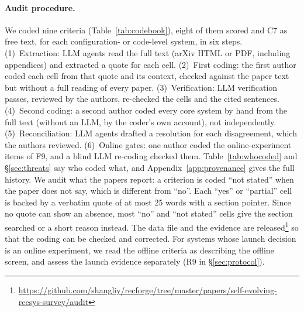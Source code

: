 \documentclass[sigconf,nonacm]{acmart}
\begin{document}
\paragraph{Audit procedure.} We coded nine criteria (Table~\ref{tab:codebook}), eight of them scored and C7 as free text, for each configuration- or code-level system, in six steps.
(1)~Extraction: LLM agents read the full text (arXiv HTML or PDF, including appendices) and extracted a quote for each cell.
(2)~First coding: the first author coded each cell from that quote and its context, checked against the paper text but without a full reading of every paper.
(3)~Verification: LLM verification passes, reviewed by the authors, re-checked the cells and the cited sentences.
(4)~Second coding: a second author coded every core system by hand from the full text (without an LLM, by the coder's own account), not independently.
(5)~Reconciliation: LLM agents drafted a resolution for each disagreement, which the authors reviewed.
(6)~Online gates: one author coded the online-experiment items of F9, and a blind LLM re-coding checked them.
Table~\ref{tab:whocoded} and \S\ref{sec:threats} say who coded what, and Appendix~\ref{app:provenance} gives the full history. We audit what the papers report: a criterion is coded ``not stated'' when the
paper does not say, which is different from ``no''. Each ``yes'' or ``partial'' cell is backed by a verbatim quote of at most 25 words
with a section pointer. Since no quote can show an absence, most ``no'' and ``not stated'' cells give the section searched or a short reason instead. The data file and the evidence are released\footnote{\url{https://github.com/shangliy/recforge/tree/master/papers/self-evolving-recsys-survey/audit}}
so that the coding can be checked and corrected. For systems whose launch decision is an online experiment, we read the offline criteria as describing the
offline screen, and assess the launch evidence separately (R9 in \S\ref{sec:protocol}).
\end{document}
